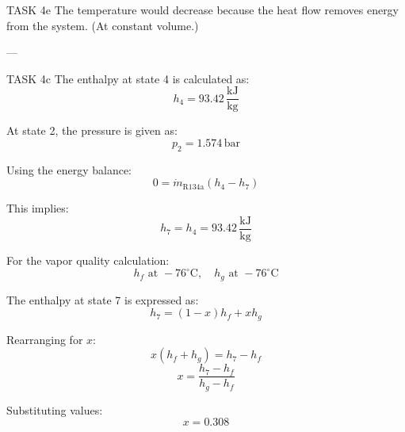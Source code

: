 TASK 4e  
The temperature would decrease because the heat flow removes energy from the system. (At constant volume.)

---

TASK 4c  
The enthalpy at state 4 is calculated as:  
\[
h_4 = 93.42 \, \frac{\text{kJ}}{\text{kg}}
\]

At state 2, the pressure is given as:  
\[
p_2 = 1.574 \, \text{bar}
\]

Using the energy balance:  
\[
0 = \dot{m}_{\text{R134a}} (h_4 - h_7)
\]

This implies:  
\[
h_7 = h_4 = 93.42 \, \frac{\text{kJ}}{\text{kg}}
\]

For the vapor quality calculation:  
\[
h_f \text{ at } -76^\circ\text{C}, \quad h_g \text{ at } -76^\circ\text{C}
\]

The enthalpy at state 7 is expressed as:  
\[
h_7 = (1 - x) h_f + x h_g
\]

Rearranging for \( x \):  
\[
x (h_f + h_g) = h_7 - h_f
\]
\[
x = \frac{h_7 - h_f}{h_g - h_f}
\]

Substituting values:  
\[
x = 0.308
\]